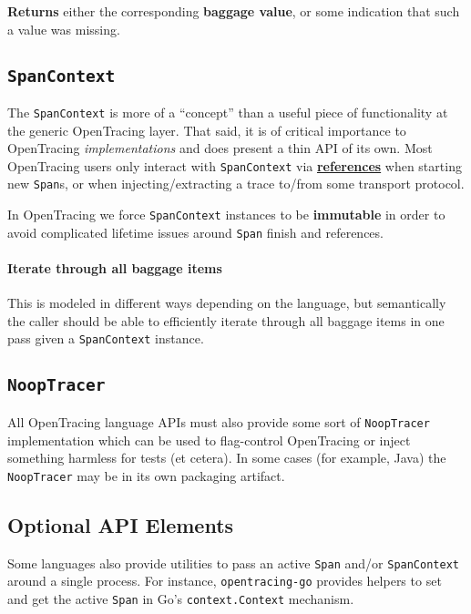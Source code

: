 \documentclass[a4paper,12pt,notitlepage,twoside,openright]{article}
\begin{document}
\textbf{Returns} either the corresponding \textbf{baggage value}, or
some indication that such a value was missing.

\hypertarget{spancontext}{%
\subsection{\texorpdfstring{\texttt{SpanContext}}{SpanContext}}\label{spancontext}}

The \texttt{SpanContext} is more of a ``concept'' than a useful piece of
functionality at the generic OpenTracing layer. That said, it is of
critical importance to OpenTracing \emph{implementations} and does
present a thin API of its own. Most OpenTracing users only interact with
\texttt{SpanContext} via
\protect\hyperlink{references-between-spans}{\textbf{references}} when
starting new \texttt{Span}s, or when injecting/extracting a trace
to/from some transport protocol.

In OpenTracing we force \texttt{SpanContext} instances to be
\textbf{immutable} in order to avoid complicated lifetime issues around
\texttt{Span} finish and references.

\hypertarget{iterate-through-all-baggage-items}{%
\paragraph{Iterate through all baggage
items}\label{iterate-through-all-baggage-items}}

This is modeled in different ways depending on the language, but
semantically the caller should be able to efficiently iterate through
all baggage items in one pass given a \texttt{SpanContext} instance.

\hypertarget{nooptracer}{%
\subsection{\texorpdfstring{\texttt{NoopTracer}}{NoopTracer}}\label{nooptracer}}

All OpenTracing language APIs must also provide some sort of
\texttt{NoopTracer} implementation which can be used to flag-control
OpenTracing or inject something harmless for tests (et cetera). In some
cases (for example, Java) the \texttt{NoopTracer} may be in its own
packaging artifact.

\hypertarget{optional-api-elements}{%
\subsection{Optional API Elements}\label{optional-api-elements}}

Some languages also provide utilities to pass an active \texttt{Span}
and/or \texttt{SpanContext} around a single process. For instance,
\texttt{opentracing-go} provides helpers to set and get the active
\texttt{Span} in Go's \texttt{context.Context} mechanism.
\end{document}
